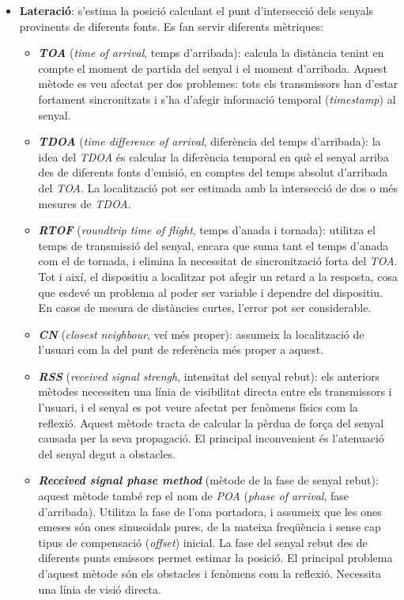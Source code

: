 \begin{itemize}

    \item \textbf{Lateració}: s'estima la posició calculant el punt d’intersecció dels senyals provinents de diferents fonts. Es fan servir diferents mètriques:

    \begin{itemize}
        \item \textbf{\textit{TOA}} (\textit{time of arrival}, temps d'arribada): calcula la distància tenint en compte el moment de partida del senyal i el moment d'arribada. Aquest mètode es veu afectat per dos problemes: tots els transmissors han d'estar fortament sincronitzats i s'ha d'afegir informació temporal (\textit{timestamp}) al senyal.
        \item \textbf{\textit{TDOA}} (\textit{time difference of arrival}, diferència del temps d'arribada): la idea del \textit{TDOA} és calcular la diferència temporal en què el senyal arriba des de diferents fonts d’emisió, en comptes del temps absolut d'arribada del \textit{TOA}. La localització pot ser estimada amb la intersecció de dos o més mesures de \textit{TDOA}.
        \item \textbf{\textit{RTOF}} (\textit{roundtrip time of flight}, temps d'anada i tornada): utilitza el temps de transmissió del senyal, encara que suma tant el temps d'anada com el de tornada, i elimina la necessitat de sincronització forta del \textit{TOA}. Tot i així, el dispositiu a localitzar pot afegir un retard a la resposta, cosa que esdevé un problema al poder ser variable i dependre del dispositiu. En casos de mesura de distàncies curtes, l'error pot ser considerable.
        \item \textbf{\textit{CN}} (\textit{closest neighbour}, veí més proper): assumeix la localització de l’usuari com la del punt de referència més proper a aquest.
        \item \textbf{\textit{RSS}} (\textit{received signal strengh}, intensitat del senyal rebut): els anteriors mètodes necessiten una línia de visibilitat directa entre els transmissors i l'usuari, i el senyal es pot veure afectat per fenòmens físics com la reflexió. Aquest mètode tracta de calcular la pèrdua de força del senyal causada per la seva propagació. El principal inconvenient és l'atenuació del senyal degut a obstacles.
        \item \textbf{\textit{Received signal phase method}} (mètode de la fase de senyal rebut): aquest mètode també rep el nom de \textit{POA} (\textit{phase of arrival}, fase d'arribada). Utilitza la fase de l'ona portadora, i assumeix que les ones emeses són ones sinusoidals pures, de la mateixa freqüència i sense cap tipus de compensació (\textit{offset}) inicial. La fase del senyal rebut des de diferents punts emissors permet estimar la posició. El principal problema d'aquest mètode són els obstacles i fenòmens com la reflexió. Necessita una línia de visió directa.


\end{itemize}
\end{itemize}
